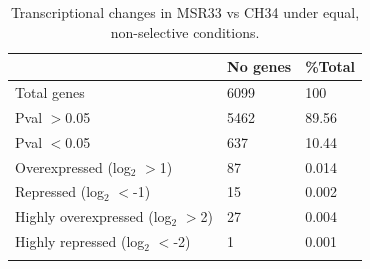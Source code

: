 \begin{table}[ht]
\caption{Transcriptional changes in MSR33 vs CH34 under equal, non-selective conditions.\\}
\label{table:45}%
{%
\begin{tabular*}{\columnwidth}{@{}lll@{}}
\hline
 & \textbf{No genes} & \textbf{\%Total} \\
\hline
Total genes & 6099 & 100\\
Pval $>$0.05 & 5462 & 89.56\\
Pval $<$0.05 & 637 & 10.44\\
Overexpressed (log$_2$ $>$1) & 87 & 0.014\\
Repressed (log$_2$ $<$-1) & 15 & 0.002\\
Highly overexpressed (log$_2$ $>$2) & 27 & 0.004\\
Highly repressed (log$_2$ $<$-2) & 1 & 0.001\\
\\
\hline
\hline
\end{tabular*}
}
\\
{
}
\end{table}



